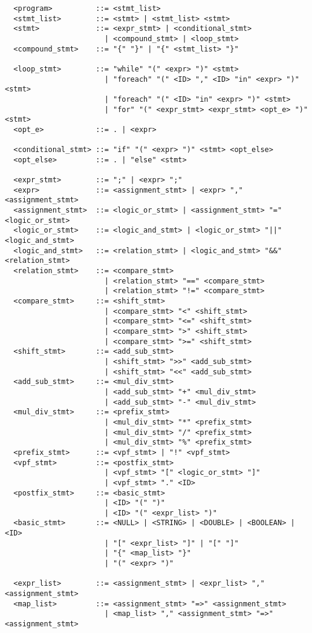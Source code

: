 \documentclass[]{article}
\begin{document}
  \lstset{language=C++}
  \begin{lstlisting}
  <program>          ::= <stmt_list>
  <stmt_list>        ::= <stmt> | <stmt_list> <stmt>
  <stmt>             ::= <expr_stmt> | <conditional_stmt> 
                       | <compound_stmt> | <loop_stmt>
  <compound_stmt>    ::= "{" "}" | "{" <stmt_list> "}"
  
  <loop_stmt>        ::= "while" "(" <expr> ")" <stmt>
                       | "foreach" "(" <ID> "," <ID> "in" <expr> ")" <stmt>
                       | "foreach" "(" <ID> "in" <expr> ")" <stmt>
                       | "for" "(" <expr_stmt> <expr_stmt> <opt_e> ")" <stmt>
  <opt_e>            ::= . | <expr>
  
  <conditional_stmt> ::= "if" "(" <expr> ")" <stmt> <opt_else>
  <opt_else>         ::= . | "else" <stmt>
  
  <expr_stmt>        ::= ";" | <expr> ";"
  <expr>             ::= <assignment_stmt> | <expr> "," <assignment_stmt>
  <assignment_stmt>  ::= <logic_or_stmt> | <assignment_stmt> "=" <logic_or_stmt>
  <logic_or_stmt>    ::= <logic_and_stmt> | <logic_or_stmt> "||" <logic_and_stmt>
  <logic_and_stmt>   ::= <relation_stmt> | <logic_and_stmt> "&&" <relation_stmt>
  <relation_stmt>    ::= <compare_stmt> 
                       | <relation_stmt> "==" <compare_stmt>
                       | <relation_stmt> "!=" <compare_stmt>
  <compare_stmt>     ::= <shift_stmt>
                       | <compare_stmt> "<" <shift_stmt>
                       | <compare_stmt> "<=" <shift_stmt>
                       | <compare_stmt> ">" <shift_stmt>
                       | <compare_stmt> ">=" <shift_stmt>
  <shift_stmt>       ::= <add_sub_stmt>
                       | <shift_stmt> ">>" <add_sub_stmt>
                       | <shift_stmt> "<<" <add_sub_stmt>
  <add_sub_stmt>     ::= <mul_div_stmt>
                       | <add_sub_stmt> "+" <mul_div_stmt>
                       | <add_sub_stmt> "-" <mul_div_stmt>                    
  <mul_div_stmt>     ::= <prefix_stmt>
                       | <mul_div_stmt> "*" <prefix_stmt>
                       | <mul_div_stmt> "/" <prefix_stmt>
                       | <mul_div_stmt> "%" <prefix_stmt>
  <prefix_stmt>      ::= <vpf_stmt> | "!" <vpf_stmt>
  <vpf_stmt>         ::= <postfix_stmt>
                       | <vpf_stmt> "[" <logic_or_stmt> "]"
                       | <vpf_stmt> "." <ID>
  <postfix_stmt>     ::= <basic_stmt>
                       | <ID> "(" ")"
                       | <ID> "(" <expr_list> ")"
  <basic_stmt>       ::= <NULL> | <STRING> | <DOUBLE> | <BOOLEAN> | <ID>
                       | "[" <expr_list> "]" | "[" "]" 
                       | "{" <map_list> "}" 
                       | "(" <expr> ")"
  
  <expr_list>        ::= <assignment_stmt> | <expr_list> "," <assignment_stmt>
  <map_list>         ::= <assignment_stmt> "=>" <assignment_stmt>
                       | <map_list> "," <assignment_stmt> "=>" <assignment_stmt> 
  \end{lstlisting}
  
\end{document}
